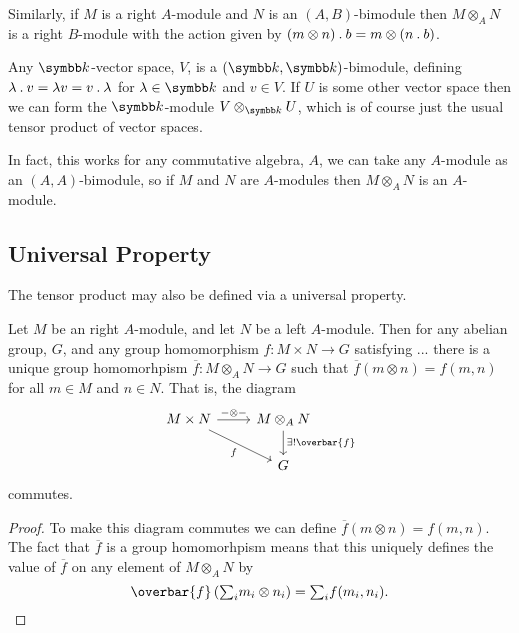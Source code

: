 Similarly, if \(M\) is a right \(A\)-module and \(N\) is an \((A, B)\)-bimodule then \(M \otimes_A N\) is a right \(B\)-module with the action given by \((m \otimes n) \mathbin{.} b = m \otimes (n \mathbin{.} b)\).

\begin{exm}{}{}
    Any \(\field\)-vector space, \(V\), is a \((\field, \field)\)-bimodule, defining \(\lambda \mathbin{.} v = \lambda v = v \mathbin{.} \lambda\) for \(\lambda \in \field\) and \(v \in V\).
    If \(U\) is some other vector space then we can form the \(\field\)-module \(V \otimes_{\field} U\), which is of course just the usual tensor product of vector spaces.
    
    In fact, this works for any commutative algebra, \(A\), we can take any \(A\)-module as an \((A, A)\)-bimodule, so if \(M\) and \(N\) are \(A\)-modules then \(M \otimes_A N\) is an \(A\)-module.
\end{exm}

\subsection{Universal Property}
The tensor product may also be defined via a universal property.

\begin{lma}{}{}
    Let \(M\) be an right \(A\)-module, and let \(N\) be a left \(A\)-module.
    Then for any abelian group, \(G\), and any group homomorphism \(f \colon M \times N \to G\) satisfying ... there is a unique group homomorhpism \(\overbar{f} \colon M \otimes_A N \to G\) such that \(\overbar{f}(m \otimes n) = f(m, n)\) for all \(m \in M\) and \(n \in N\).
    That is, the diagram
    \begin{equation}
        \begin{tikzcd}
            M \times N \arrow[r, "{-}\otimes{-}"] \arrow[dr, "f"'] & M \otimes_A N \arrow[d, "\exists ! \overbar{f}"]\\
            & G
        \end{tikzcd}
    \end{equation}
    commutes.
    \begin{proof}
        To make this diagram commutes we can define \(\overbar{f}(m \otimes n) = f(m, n)\).
        The fact that \(\overbar{f}\) is a group homomorhpism means that this uniquely defines the value of \(\overbar{f}\) on any element of \(M \otimes_A N\) by
        \begin{equation}
            \overbar{f}\left( {\textstyle \sum_i} m_i \otimes n_i \right) = {\textstyle\sum_i} f(m_i, n_i). \qedhere
        \end{equation}
    \end{proof}
\end{lma}

